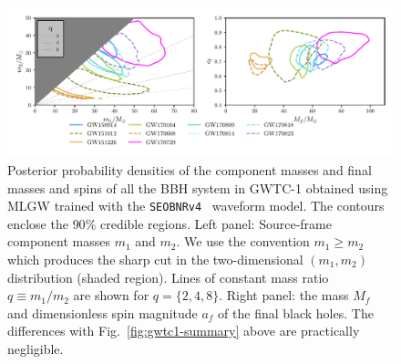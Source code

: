 \begin{figure}[t]
	\centering
    \includegraphics[width=\textwidth]{img/posterior_masses_final_seob.pdf}
	\caption{
	Posterior probability densities of the component masses and final masses and spins 
	of all the BBH system in GWTC-1 obtained using MLGW trained with the {\tt SEOBNRv4}~\cite{Bohe:2016gbl}
	waveform model. The contours enclose the $90\%$ credible regions.
	Left panel: Source-frame component masses $m_1$ and $m_2$. We use the convention $m_1\geq m_2$ which 
	produces the sharp cut in the two-dimensional $(m_1,m_2)$ distribution (shaded region). Lines of
	constant mass ratio $q\equiv m_1/m_2$ are shown for $q=\{2,4,8\}$. Right panel: the mass $M_f$
	and dimensionless spin magnitude $a_f$ of the final black holes. The differences with 
	Fig.~\ref{fig:gwtc1-summary} above are practically negligible.}
	\label{fig:gwtc1-summary_seob}
\end{figure}


